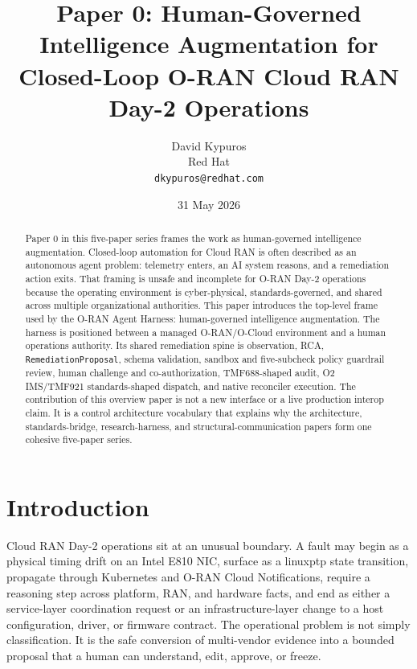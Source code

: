\documentclass[twocolumn,10pt,a4paper]{article}
\title{Paper 0: Human-Governed Intelligence Augmentation for Closed-Loop O-RAN Cloud RAN Day-2 Operations}
\author{David Kypuros \\
\small Red Hat \\
\small \texttt{dkypuros@redhat.com}}
\date{31 May 2026}
\begin{document}
\maketitle

\begin{abstract}
Paper 0 in this five-paper series frames the work as human-governed intelligence augmentation. Closed-loop automation for Cloud RAN is often described as an autonomous agent problem: telemetry enters, an AI system reasons, and a remediation action exits. That framing is unsafe and incomplete for O-RAN Day-2 operations because the operating environment is cyber-physical, standards-governed, and shared across multiple organizational authorities. This paper introduces the top-level frame used by the O-RAN Agent Harness: human-governed intelligence augmentation. The harness is positioned between a managed O-RAN/O-Cloud environment and a human operations authority. Its shared remediation spine is observation, RCA, \texttt{RemediationProposal}, schema validation, sandbox and five-subcheck policy guardrail review, human challenge and co-authorization, TMF688-shaped audit, O2 IMS/TMF921 standards-shaped dispatch, and native reconciler execution. The contribution of this overview paper is not a new interface or a live production interop claim. It is a control architecture vocabulary that explains why the architecture, standards-bridge, research-harness, and structural-communication papers form one cohesive five-paper series.
\end{abstract}

\section{Introduction}

Cloud RAN Day-2 operations sit at an unusual boundary. A fault may begin as a physical timing drift on an Intel E810 NIC, surface as a linuxptp state transition, propagate through Kubernetes and O-RAN Cloud Notifications, require a reasoning step across platform, RAN, and hardware facts, and end as either a service-layer coordination request or an infrastructure-layer change to a host configuration, driver, or firmware contract. The operational problem is not simply classification. It is the safe conversion of multi-vendor evidence into a bounded proposal that a human can understand, edit, approve, or freeze.
\end{document}
